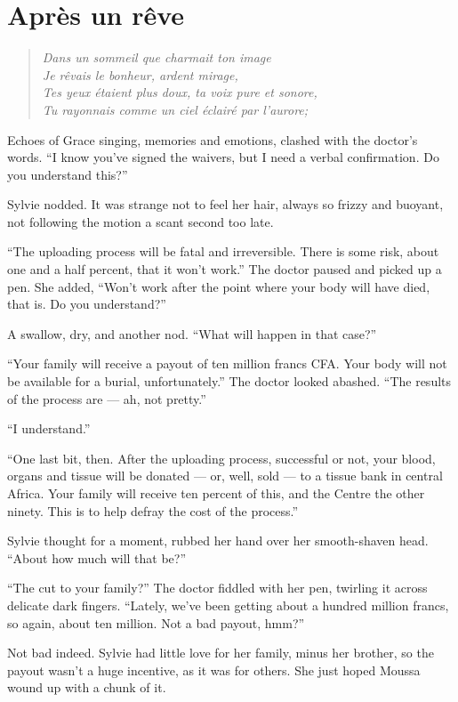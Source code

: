 \chapter{Après un rêve}

\begin{quote}
\emph{Dans un sommeil que charmait ton image\\
Je rêvais le bonheur, ardent mirage,\\
Tes yeux étaient plus doux, ta voix pure et sonore,\\
Tu rayonnais comme un ciel éclairé par l'aurore;}
\end{quote}

Echoes of Grace singing, memories and emotions, clashed with the doctor's words. ``I know you've signed the waivers, but I need a verbal confirmation. Do you understand this?''

Sylvie nodded. It was strange not to feel her hair, always so frizzy and buoyant, not following the motion a scant second too late.

``The uploading process will be fatal and irreversible. There is some risk, about one and a half percent, that it won't work.'' The doctor paused and picked up a pen. She added, ``Won't work after the point where your body will have died, that is. Do you understand?''

A swallow, dry, and another nod. ``What will happen in that case?''

``Your family will receive a payout of ten million francs CFA. Your body will not be available for a burial, unfortunately.'' The doctor looked abashed. ``The results of the process are --- ah, not pretty.''

``I understand.''

``One last bit, then. After the uploading process, successful or not, your blood, organs and tissue will be donated --- or, well, sold --- to a tissue bank in central Africa. Your family will receive ten percent of this, and the Centre the other ninety. This is to help defray the cost of the process.''

Sylvie thought for a moment, rubbed her hand over her smooth-shaven head. ``About how much will that be?''

``The cut to your family?'' The doctor fiddled with her pen, twirling it across delicate dark fingers. ``Lately, we've been getting about a hundred million francs, so again, about ten million. Not a bad payout, hmm?''

Not bad indeed. Sylvie had little love for her family, minus her brother, so the payout wasn't a huge incentive, as it was for others. She just hoped Moussa wound up with a chunk of it.

